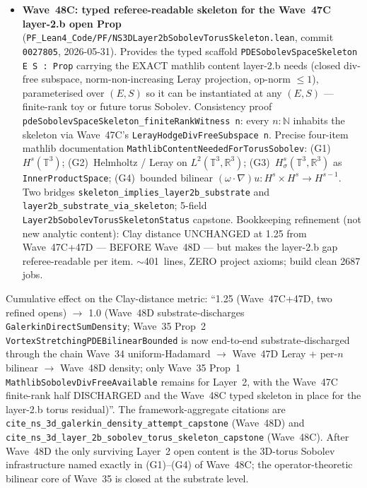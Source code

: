 \begin{remark}
\begin{itemize}
  \item \textbf{Wave~48C: typed referee-readable skeleton for the Wave~47C layer-2.b open Prop} (\texttt{PF\_Lean4\_Code/PF/NS3DLayer2bSobolevTorusSkeleton.lean}, commit \texttt{0027805}, 2026-05-31). Provides the typed scaffold \texttt{PDESobolevSpaceSkeleton E S : Prop} carrying the EXACT mathlib content layer-2.b needs (closed div-free subspace, norm-non-increasing Leray projection, op-norm $\leq 1$), parameterised over $(E, S)$ so it can be instantiated at any $(E, S)$ --- finite-rank toy or future torus Sobolev. Consistency proof \texttt{pdeSobolevSpaceSkeleton\_finiteRankWitness n}: every $n : \mathbb{N}$ inhabits the skeleton via Wave~47C's \texttt{LerayHodgeDivFreeSubspace n}. Precise four-item mathlib documentation \texttt{MathlibContentNeededForTorusSobolev}: (G1)~$H^s(\mathbb{T}^3)$; (G2)~Helmholtz / Leray on $L^2(\mathbb{T}^3, \mathbb{R}^3)$; (G3)~$H^s_\sigma(\mathbb{T}^3, \mathbb{R}^3)$ as \texttt{InnerProductSpace}; (G4)~bounded bilinear $(\omega \cdot \nabla)u : H^s \times H^s \to H^{s-1}$. Two bridges \texttt{skeleton\_implies\_layer2b\_substrate} and \texttt{layer2b\_substrate\_via\_skeleton}; 5-field \texttt{Layer2bSobolevTorusSkeletonStatus} capstone. Bookkeeping refinement (not new analytic content): Clay distance UNCHANGED at 1.25 from Wave~47C+47D --- BEFORE Wave~48D --- but makes the layer-2.b gap referee-readable per item. $\sim$401~lines, ZERO project axioms; build clean 2687 jobs.
\end{itemize}
Cumulative effect on the Clay-distance metric: ``1.25 (Wave~47C+47D, two refined opens) $\to$ 1.0 (Wave~48D substrate-discharges \texttt{GalerkinDirectSumDensity}; Wave~35 Prop~2 \texttt{VortexStretchingPDEBilinearBounded} is now end-to-end substrate-discharged through the chain Wave~34 uniform-Hadamard $\to$ Wave~47D Leray + per-$n$ bilinear $\to$ Wave~48D density; only Wave~35 Prop~1 \texttt{MathlibSobolevDivFreeAvailable} remains for Layer~2, with the Wave~47C finite-rank half DISCHARGED and the Wave~48C typed skeleton in place for the layer-2.b torus residual)''. The framework-aggregate citations are \texttt{cite\_ns\_3d\_galerkin\_density\_attempt\_capstone} (Wave~48D) and \texttt{cite\_ns\_3d\_layer\_2b\_sobolev\_torus\_skeleton\_capstone} (Wave~48C). After Wave~48D the only surviving Layer~2 open content is the 3D-torus Sobolev infrastructure named exactly in (G1)--(G4) of Wave~48C; the operator-theoretic bilinear core of Wave~35 is closed at the substrate level.


\end{remark}
